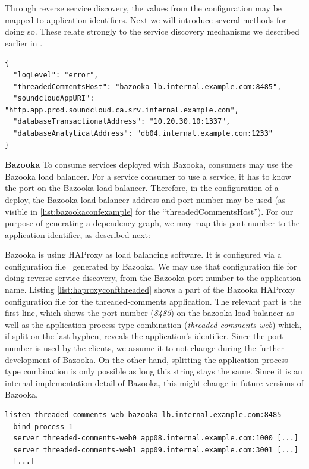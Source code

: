 Through reverse service discovery, the values from the configuration may be mapped to application identifiers. Next we will introduce several methods for doing so. These relate strongly to the service discovery mechanisms we described earlier in .

\pagebreak

\begin{lstlisting}[caption=Example configuration of an application in Bazooka,label=list:bazookaconfexample]
{
  "logLevel": "error",
  "threadedCommentsHost": "bazooka-lb.internal.example.com:8485",
  "soundcloudAppURI": "http.app.prod.soundcloud.ca.srv.internal.example.com",
  "databaseTransactionalAddress": "10.20.30.10:1337",
  "databaseAnalyticalAddress": "db04.internal.example.com:1233"
}
\end{lstlisting}

\textbf{Bazooka} To consume services deployed with Bazooka, consumers may use the Bazooka load balancer. For a service consumer to use a service, it has to know the port on the Bazooka load balancer. Therefore, in the configuration of a deploy, the Bazooka load balancer address and port number may be used (as visible in \ref{list:bazookaconfexample} for the ``threadedCommentsHost''). For our purpose of generating a dependency graph, we may map this port number to the application identifier, as described next:

Bazooka is using HAProxy as load balancing software. It is configured via a configuration file~\cite{haproxyconf} generated by Bazooka.  We may use that configuration file for doing reverse service discovery, from the Bazooka port number to the application name. Listing \ref{list:haproxyconfthreaded} shows a part of the Bazooka HAProxy configuration file for the threaded-comments application. The relevant part is the first line, which shows the port number (\emph{8485}) on the bazooka load balancer as well as the application-process-type combination (\emph{threaded-comments-web}) which, if split on the last hyphen, reveals the application's identifier. Since the port number is used by the clients, we assume it to not change during the further development of Bazooka. On the other hand, splitting the application-process-type combination is only possible as long this string stays the same. Since it is an internal implementation detail of Bazooka, this might change in future versions of Bazooka.

\begin{lstlisting}[caption=Bazooka HAProxy configuration file excerpt for the threaded-comments application,label=list:haproxyconfthreaded]
listen threaded-comments-web bazooka-lb.internal.example.com:8485
  bind-process 1
  server threaded-comments-web0 app08.internal.example.com:1000 [...]
  server threaded-comments-web1 app09.internal.example.com:3001 [...]
  [...]
\end{lstlisting}

